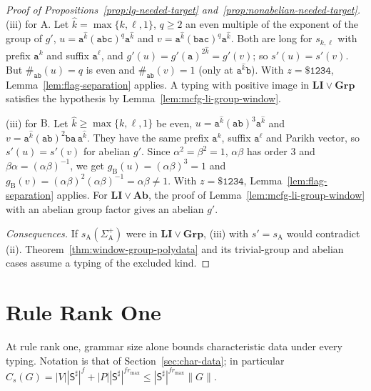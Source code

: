 \begin{proof}[Proof of Propositions~\ref{prop:lg-needed-target}
and~\ref{prop:nonabelian-needed-target}]
(iii) for $\mathrm A$.  Let $\hat k=\max\{k,\ell,1\}$, $q\ge2$ an even multiple of the
exponent of the group of $g'$, $u=\mathtt a^{\hat k}(\mathtt{abc})^q\mathtt a^{\hat k}$
and $v=\mathtt a^{\hat k}(\mathtt{bac})^q\mathtt a^{\hat k}$.  Both are long for
$s_{k,\ell}$ with prefix $\mathtt a^k$ and suffix $\mathtt a^\ell$, and
$g'(u)=g'(\mathtt a)^{2\hat k}=g'(v)$; so $s'(u)=s'(v)$.  But $\#_{\mathtt{ab}}(u)=q$ is
even and $\#_{\mathtt{ab}}(v)=1$ (only at $\mathtt a^{\hat k}\mathtt b$).  With
$z=\mathtt{\$1234}$, Lemma~\ref{lem:flag-separation} applies.  A typing with positive
image in $\mathbf{LI}\vee\mathbf{Grp}$ satisfies the hypothesis by
Lemma~\ref{lem:mcfg-li-group-window}.

(iii) for $\mathrm B$.  Let $\hat k\ge\max\{k,\ell,1\}$ be even,
$u=\mathtt a^{\hat k}(\mathtt{ab})^3\mathtt a^{\hat k}$ and
$v=\mathtt a^{\hat k}(\mathtt{ab})^2\mathtt{ba}\,\mathtt a^{\hat k}$.  They have the same
prefix $\mathtt a^k$, suffix $\mathtt a^\ell$ and Parikh vector, so $s'(u)=s'(v)$ for abelian
$g'$.  Since $\alpha^2=\beta^2=1$, $\alpha\beta$ has order $3$ and
$\beta\alpha=(\alpha\beta)^{-1}$, we get $g_{\mathrm B}(u)=(\alpha\beta)^3=1$ and
$g_{\mathrm B}(v)=(\alpha\beta)^2(\alpha\beta)^{-1}=\alpha\beta\ne1$.  With
$z=\mathtt{\$1234}$, Lemma~\ref{lem:flag-separation} applies.  For
$\mathbf{LI}\vee\mathbf{Ab}$, the proof of Lemma~\ref{lem:mcfg-li-group-window} with
an abelian group factor gives an abelian $g'$.

\emph{Consequences.}  If $s_{\mathrm A}(\Sigma_{\mathrm A}^+)$ were in
$\mathbf{LI}\vee\mathbf{Grp}$, (iii) with $s'=s_{\mathrm A}$ would contradict (ii).
Theorem~\ref{thm:window-group-polydata} and its trivial-group and abelian cases
assume a typing of the excluded kind.
\end{proof}

\section{Rule Rank One}
\label{sec:further}
\label{subsec:rank-one}

At rule rank one, grammar size alone bounds characteristic data under every
typing.  Notation is that of Section~\ref{sec:char-data}; in particular
$C_s(G)=|V||\mathsf S^\sharp|^f+|P||\mathsf S^\sharp|^{fr_{\max}}\le
|\mathsf S^\sharp|^{fr_{\max}}\|G\|$.

